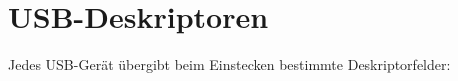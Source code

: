 \documentclass[]{beamer}
\begin{document}
	\begin{frame}{\secname}
		\lstset{language=tikz}
		
	\end{frame}
	
	\begin{frame}{\secname}
		\lstset{language=tikz}
		
		
	\end{frame}
	
	\begin{frame}{\secname}
		\lstset{language=tikz}
		
		
	\end{frame}
	
	\begin{frame}{\secname}
		\lstset{language=tikz}
		
		
	\end{frame}	
	
	\section{USB-Deskriptoren}
	\begin{frame}{\secname}
		Jedes USB-Gerät übergibt beim Einstecken bestimmte Deskriptorfelder:
		
	\end{frame}
	
	\begin{frame}{\secname}
		\lstset{language=tikz}

		
	\end{frame}	
	
	\begin{frame}{\secname}
		\lstset{language=tikz}

		
	\end{frame}		
	
\end{document}
